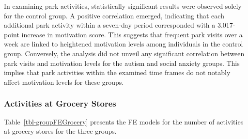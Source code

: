 \documentclass[
  letterpaper,
  number,
  review,
  3p]{elsarticle}
\begin{document}
\begin{table}

\caption{\label{tbl-groupFEParks}FE Models: Motivation and Number of
Activities at Parks by Group}


\end{table}%

In examining park activities, statistically significant results were
observed solely for the control group. A positive correlation emerged,
indicating that each additional park activity within a seven-day period
corresponded with a 3.017-point increase in motivation score. This
suggests that frequent park visits over a week are linked to heightened
motivation levels among individuals in the control group. Conversely,
the analysis did not unveil any significant correlation between park
visits and motivation levels for the autism and social anxiety groups.
This implies that park activities within the examined time frames do not
notably affect motivation levels for these groups.

\subsubsection{Activities at Grocery
Stores}\label{activities-at-grocery-stores}

Table~\ref{tbl-groupFEGrocery} presents the FE models for the number of
activities at grocery stores for the three groups.
\end{document}
